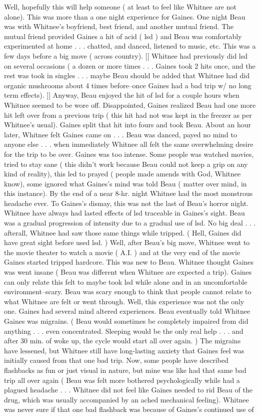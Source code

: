 \documentclass[12pt]{book}
\begin{document}
Well, hopefully this will help someone ( at least to feel like Whitnee are not alone). This was more than a one night experience for Gaines. One night Beau was with Whitnee's boyfriend, best friend, and another mutual friend. The mutual friend provided Gaines a hit of acid ( lsd ) and Beau was comfortably experimented at home . . .  chatted, and danced, listened to music, etc. This was a few days before a big move ( across country). [[ Whitnee had previously did lsd on several occasions ( a dozen or more times . . .  Gaines took 2 hits once, and the rest was took in singles . . .  maybe Beau should be added that Whitnee had did organic mushrooms about 4 times before--once Gaines had a bad trip w/ no long term effects). ]] Anyway, Beau enjoyed the hit of lsd for a couple hours when Whitnee seemed to be wore off. Disappointed, Gaines realized Beau had one more hit left over from a previous trip ( this hit had not was kept in the freezer as per Whitnee's usual). Gaines split that hit into fours and took Beau. About an hour later, Whitnee felt Gaines came on . . .  Beau was danced, payed no mind to anyone else . . .  when immediately Whitnee all felt the same overwhelming desire for the trip to be over. Gaines was too intense. Some people was watched movies, tried to stay sane ( this didn't work because Beau could not keep a grip on any kind of reality), this led to prayed ( people made amends with God, Whitnee know), some ignored what Gaines's mind was told Beau ( matter over mind, in this instance). By the end of a near 8-hr. night Whitnee had the most monstrous headache ever. To Gaines's dismay, this was not the last of Beau's horror night. Whitnee have always had lasted effects of lsd traceable in Gaines's sight. Beau was a gradual progression of intensity due to a gradual use of lsd. No big deal . . .  afterall, Whitnee had saw those same things while tripped. ( Hell, Gaines did have great sight before used lsd. ) Well, after Beau's big move, Whitnee went to the movie theater to watch a movie ( A.I. ) and at the very end of the movie Gaines started tripped hardcore. This was new to Beau. Whitnee thought Gaines was went insane ( Beau was different when Whitnee are expected a trip). Gaines can only relate this felt to maybe took lsd while alone and in an uncomfortable environment--scary. Beau was scary enough to think that people cannot relate to what Whitnee are felt or went through. Well, this experience was not the only one. Gaines had several mind altered experiences. Beau eventually told Whitnee Gaines was migrains. ( Beau would sometimes be completely impaired from did anything . . .  even concentrated. Sleeping would be the only real help . . .  and after 30 min. of woke up, the cycle would start all over again. ) The migrains have lessened, but Whitnee still have long-lasting anxiety that Gaines feel was initially caused from that one bad trip. Now, some people have described flashbacks as fun or just visual in nature, but mine was like had that same bad trip all over again ( Beau was felt more bothered psychologically while had a plagued headache . . .  Whitnee did not feel like Gaines needed to rid Beau of the drug, which was usually accompanied by an ached mechanical feeling). Whitnee was never sure if that one bad flashback was because of Gaines's continued use of 
\end{document}
